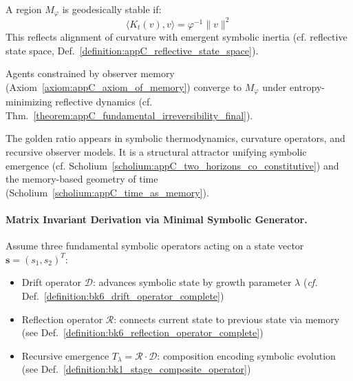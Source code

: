 \begin{definition}
\label{def:appC_phi_stable_region}
A region $M_\varphi$ is geodesically stable if:
\[
\langle K_t(v), v \rangle = \varphi^{-1} \|v\|^2
\]
This reflects alignment of curvature with emergent symbolic inertia (cf. reflective state space, Def.~\ref{definition:appC_reflective_state_space}).
\end{definition}

\begin{lemma}
\label{lem:appC_geodesic_convergence}
Agents constrained by observer memory (Axiom~\ref{axiom:appC_axiom_of_memory}) converge to $M_\varphi$ under entropy-minimizing reflective dynamics (cf. Thm.~\ref{theorem:appC_fundamental_irreversibility_final}).
\end{lemma}

\begin{scholium}
\label{sch:appC_symbolic_geometric_equivalence}
The golden ratio appears in symbolic thermodynamics, curvature operators, and recursive observer models. It is a structural attractor unifying symbolic emergence (cf. Scholium~\ref{scholium:appC_two_horizons_co_constitutive}) and the memory-based geometry of time (Scholium~\ref{scholium:appC_time_as_memory}).
\end{scholium}

\paragraph{Matrix Invariant Derivation via Minimal Symbolic Generator.}
\label{paragraph:appC_matrix_invariant_derivation_phi}

\begin{definition}
\label{def:appC_symbolic_operator_assumptions}
Assume three fundamental symbolic operators acting on a state vector $\mathbf{s} = (s_1, s_2)^T$:
\begin{itemize}
\item Drift operator $\mathcal{D}$: advances symbolic state by growth parameter $\lambda$ (\emph{cf.} Def.~\ref{definition:bk6_drift_operator_complete})
\item Reflection operator $\mathcal{R}$: connects current state to previous state via memory (see Def.~\ref{definition:bk6_reflection_operator_complete})
\item Recursive emergence $T_\lambda = \mathcal{R} \cdot \mathcal{D}$: composition encoding symbolic evolution (see Def.~\ref{definition:bk1_stage_composite_operator})
\end{itemize}
\end{definition}

